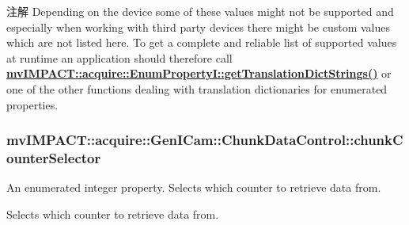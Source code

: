 \begin{DoxyNote}{注解}
Depending on the device some of these values might not be supported and especially when working with third party devices there might be custom values which are not listed here. To get a complete and reliable list of supported values at runtime an application should therefore call {\bfseries \hyperlink{classmv_i_m_p_a_c_t_1_1acquire_1_1_enum_property_i_a0ba6ccbf5ee69784d5d0b537924d26b6}{mv\+I\+M\+P\+A\+C\+T\+::acquire\+::\+Enum\+Property\+I\+::get\+Translation\+Dict\+Strings()}} or one of the other functions dealing with translation dictionaries for enumerated properties. 
\end{DoxyNote}
\hypertarget{classmv_i_m_p_a_c_t_1_1acquire_1_1_gen_i_cam_1_1_chunk_data_control_ac43d711538b1fb622260f8dc3c1cc4af}{
\subsubsection[{chunk\+Counter\+Selector}]{ mv\+I\+M\+P\+A\+C\+T\+::acquire\+::\+Gen\+I\+Cam\+::\+Chunk\+Data\+Control\+::chunk\+Counter\+Selector}}\label{classmv_i_m_p_a_c_t_1_1acquire_1_1_gen_i_cam_1_1_chunk_data_control_ac43d711538b1fb622260f8dc3c1cc4af}


An enumerated integer property. Selects which counter to retrieve data from. 

Selects which counter to retrieve data from.

